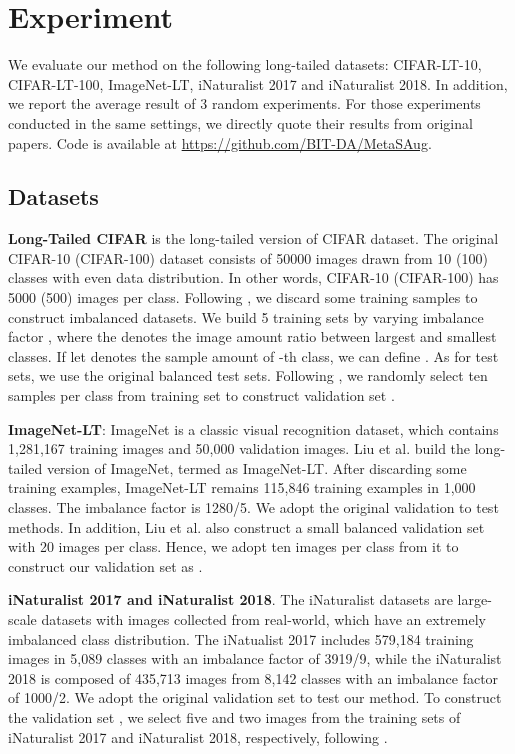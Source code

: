 \section{Experiment}
We evaluate our method on the following long-tailed datasets: CIFAR-LT-10, CIFAR-LT-100, ImageNet-LT, iNaturalist 2017 and iNaturalist 2018. In addition, we report the average result of 3 random experiments. For those experiments conducted in the same settings, we directly quote their results from original papers. Code is available at \url{https://github.com/BIT-DA/MetaSAug}.

\subsection{Datasets}
\textbf{Long-Tailed CIFAR} is the long-tailed version of CIFAR dataset. The original CIFAR-10 (CIFAR-100) dataset consists of 50000 images drawn from 10 (100) classes with even data distribution. In other words, CIFAR-10 (CIFAR-100) has 5000 (500) images per class. Following \cite{cui2019class}, we discard some training samples to construct imbalanced datasets. We build 5 training sets by varying imbalance factor , where the  denotes the image amount ratio between largest and smallest classes. If let  denotes the sample amount of -th class, we can define . As for test sets, we use the original balanced test sets. Following \cite{jamal2020rethinking}, we randomly select ten samples per class from training set to construct validation set .

\textbf{ImageNet-LT}: ImageNet \cite{imagenet2014} is a classic visual recognition dataset, which contains 1,281,167 training images and 50,000 validation images. Liu et al. \cite{liu2019large} build the long-tailed version of ImageNet, termed as ImageNet-LT. After discarding some training examples, ImageNet-LT remains 115,846 training examples in 1,000 classes. The imbalance factor is 1280/5. We adopt the original validation to test methods. In addition, Liu et al. \cite{liu2019large} also construct a small balanced validation set with 20 images per class. Hence, we adopt ten images per class from it to construct our validation set  as \cite{jamal2020rethinking}.

\textbf{iNaturalist 2017 and iNaturalist 2018}. The iNaturalist datasets are large-scale datasets with images collected from real-world, which have an extremely imbalanced class distribution. The iNatualist 2017 \cite{inaturalist2017} includes 579,184 training images in 5,089 classes with an imbalance factor of 3919/9, while the iNaturalist 2018 \cite{inaturalist} is composed of 435,713 images from 8,142 classes with an imbalance factor of 1000/2. We adopt the original validation set to test our method. To construct the validation set , we select five and two images from the training sets of iNaturalist 2017 and iNaturalist 2018, respectively, following \cite{jamal2020rethinking}.


